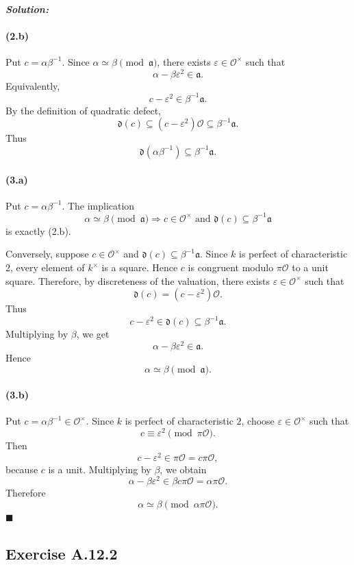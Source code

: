\documentclass[12pt, a4paper]{article}
\newenvironment{solution}
  {\paragraph{\textit{Solution:}}\par\medskip}
  {\hfill$\blacksquare$\vspace{0.1cm}}
\begin{document}
\begin{solution}
\paragraph*{(2.b)}
Put $c=\alpha\beta^{-1}$. Since
$\alpha\simeq\beta\pmod{\mathfrak a}$, there exists
$\varepsilon\in\mathcal O^\times$ such that
\[
    \alpha-\beta\varepsilon^2\in\mathfrak a.
\]
Equivalently,
\[
    c-\varepsilon^2\in\beta^{-1}\mathfrak a.
\]
By the definition of quadratic defect,
\[
    \mathfrak d(c)\subseteq (c-\varepsilon^2)\mathcal O
    \subseteq \beta^{-1}\mathfrak a.
\]
Thus
\[
    \mathfrak d(\alpha\beta^{-1})\subseteq\beta^{-1}\mathfrak a.
\]

\paragraph*{(3.a)}
Put $c=\alpha\beta^{-1}$. The implication
\[
    \alpha\simeq\beta\pmod{\mathfrak a}
    \Longrightarrow
    c\in\mathcal O^\times
    \text{ and }
    \mathfrak d(c)\subseteq\beta^{-1}\mathfrak a
\]
is exactly (2.b).

Conversely, suppose $c\in\mathcal O^\times$ and
$\mathfrak d(c)\subseteq\beta^{-1}\mathfrak a$. Since $k$ is perfect of
characteristic $2$, every element of $k^\times$ is a square. Hence $c$ is
congruent modulo $\pi\mathcal O$ to a unit square. Therefore, by discreteness
of the valuation, there exists $\varepsilon\in\mathcal O^\times$ such that
\[
    \mathfrak d(c)=(c-\varepsilon^2)\mathcal O .
\]
Thus
\[
    c-\varepsilon^2\in \mathfrak d(c)\subseteq \beta^{-1}\mathfrak a.
\]
Multiplying by $\beta$, we get
\[
    \alpha-\beta\varepsilon^2\in\mathfrak a.
\]
Hence
\[
    \alpha\simeq\beta\pmod{\mathfrak a}.
\]

\paragraph*{(3.b)}
Put $c=\alpha\beta^{-1}\in\mathcal O^\times$. Since $k$ is perfect of
characteristic $2$, choose $\varepsilon\in\mathcal O^\times$ such that
\[
    c\equiv \varepsilon^2\pmod{\pi\mathcal O}.
\]
Then
\[
    c-\varepsilon^2\in\pi\mathcal O=c\pi\mathcal O,
\]
because $c$ is a unit. Multiplying by $\beta$, we obtain
\[
    \alpha-\beta\varepsilon^2\in \beta c\pi\mathcal O
    =
    \alpha\pi\mathcal O.
\]
Therefore
\[
    \alpha\simeq\beta\pmod{\alpha\pi\mathcal O}.
\]
\end{solution}


\subsection*{Exercise A.12.2}
\end{document}
